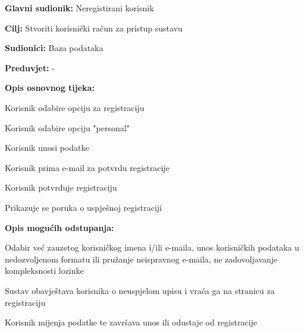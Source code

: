 					\noindent {}
					\begin{packed_item}
	
						\item \textbf{Glavni sudionik: }Neregistirani korisnik
						\item  \textbf{Cilj:} Stvoriti korisnički račun za pristup sustavu
						\item  \textbf{Sudionici:} Baza podataka
						\item  \textbf{Preduvjet:} -
						\item  \textbf{Opis osnovnog tijeka:}
						
						\item[] \begin{packed_enum}
	
							\item Korisnik odabire opciju za registraciju
							\item Korisnik odabire opciju "personal"
							\item Korisnik unosi podatke
							\item Korisnik prima e-mail za potvrdu registracije
							\item Korisnik potvrđuje registraciju
							\item Prikazuje se poruka o uspješnoj registraciji

						\end{packed_enum}
						
						\item  \textbf{Opis mogućih odstupanja:}
						
						\item[] \begin{packed_item}
	
							\item[2.a] Odabir već zauzetog korisničkog imena i/ili e-maila, unos korisničkih podataka u nedozvoljenom formatu ili pružanje neispravnog e-maila, ne zadovoljavanje kompleksnosti lozinke
							\item[] \begin{packed_enum}
								
								\item Sustav obavještava korisnika o neuspjelom upisu i vraća ga na stranicu za registraciju
								\item Korisnik mijenja podatke te završava unos ili odustaje od registracije
								
							\end{packed_enum}
							
						\end{packed_item}
					\end{packed_item}
					
